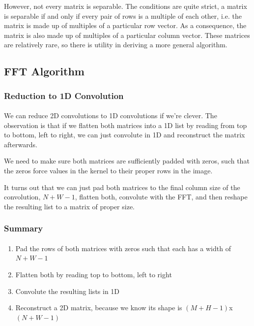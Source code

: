 \documentclass[11pt,handout]{beamer}             %
\begin{document}
\begin{frame}
\frametitle{}
\framesubtitle{}
However, not every matrix is separable. The conditions are quite strict,
a matrix is separable if and only if every pair of rows is a multiple of each
other, i.e. the matrix is made up of multiples of a particular row vector.
As a consequence, the matrix is also made up of multiples of a particular
column vector. These matrices are relatively rare, so there is utility
in deriving a more general algorithm.
\end{frame}

\subsection{FFT Algorithm}
\begin{frame}
\frametitle{Reduction to 1D Convolution}
\framesubtitle{}
We can reduce 2D convolutions to 1D convolutions if we're clever.
The observation is that if we \alert{flatten} both matrices into a 1D list
by reading from top to bottom, left to right, we can just convolute in 1D
and reconstruct the matrix afterwards. \pause

We need to make sure both matrices are sufficiently padded with zeros, such that
the zeros force values in the kernel to their proper rows in the image. \pause

It turns out that we can just pad both matrices
to the final column size of the convolution, 
\( N + W - 1 \), flatten both, convolute with the FFT, and then reshape the
resulting list to a matrix of proper size.
\end{frame}

\begin{frame}
\frametitle{Summary}
\framesubtitle{}
\begin{enumerate}[<+->]
  \item Pad the rows of both matrices with zeros such that
    each has a width of \( N + W - 1 \)
  \item Flatten both by reading top to bottom, left to right
  \item Convolute the resulting lists in 1D
  \item Reconstruct a 2D matrix, because we know its shape is
    \( (M + H - 1) \)x\( (N + W - 1) \)
\end{enumerate}
\end{frame}
\end{document}
